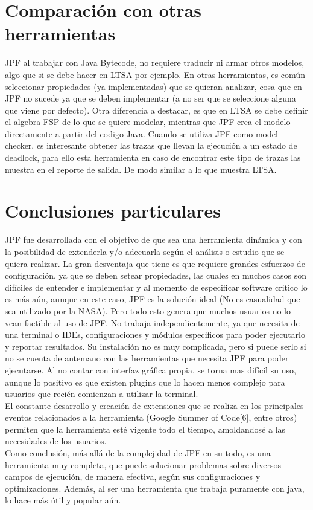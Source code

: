 \documentclass[runningheads]{llncs}
\begin{document}
\section{Comparaci\'on con otras herramientas}

JPF al trabajar con Java Bytecode, no requiere traducir ni armar otros modelos, algo que si se debe hacer en LTSA por ejemplo. En otras herramientas, es com\'un seleccionar propiedades (ya implementadas) que se quieran analizar, cosa que en JPF no sucede ya que se deben implementar (a no ser que se seleccione alguna que viene por defecto).
Otra diferencia a destacar, es que en LTSA se debe definir el algebra FSP de lo que se quiere modelar, mientras que JPF crea el modelo directamente a partir del codigo Java.
Cuando se utiliza JPF como model checker, es interesante obtener las trazas que llevan la ejecuci\'on a un estado de deadlock, para ello esta herramienta en caso de encontrar este tipo de trazas las muestra en el reporte de salida. De modo similar a lo que muestra LTSA.


\section{Conclusiones particulares}

JPF fue desarrollada con el objetivo de que sea una herramienta din\'amica y con la posibilidad de extenderla y/o adecuarla seg\'un el an\'alisis o estudio que se quiera realizar. La gran desventaja que tiene es que requiere grandes esfuerzos de configuraci\'on, ya que se deben setear propiedades, las cuales en muchos casos son dif\'iciles de entender e implementar y al momento de especificar software critico lo es m\'as a\'un, aunque en este caso, JPF es la soluci\'on ideal (No es casualidad que sea utilizado por la NASA). Pero todo esto genera que muchos usuarios no lo vean factible al uso de JPF.
No trabaja independientemente, ya que necesita de una terminal o IDEs, configuraciones y m\'odulos especificos para poder ejecutarlo y reportar resultados. Su instalaci\'on no es muy complicada, pero si puede serlo si no se cuenta de antemano con las herramientas que necesita JPF para poder ejecutarse. Al no contar con interfaz gr\'afica propia, se torna mas dif\'icil su uso, aunque lo positivo es que existen plugins que lo hacen menos complejo para usuarios que reci\'en comienzan a utilizar la terminal.\\
El constante desarrollo y creaci\'on de extensiones que se realiza en los principales eventos relacionados a la herramienta (Google Summer of Code[6], entre otros) permiten que la herramienta est\'e vigente todo el tiempo, amoldandos\'e a las necesidades de los usuarios.\\
Como conclusi\'on, m\'as all\'a de la complejidad de JPF en su todo, es una herramienta muy completa, que puede solucionar problemas sobre diversos campos de ejecuci\'on, de manera efectiva, seg\'un sus configuraciones y optimizaciones. Adem\'as, al ser una herramienta que trabaja puramente con java, lo hace m\'as \'util y popular a\'un.
\end{document}
